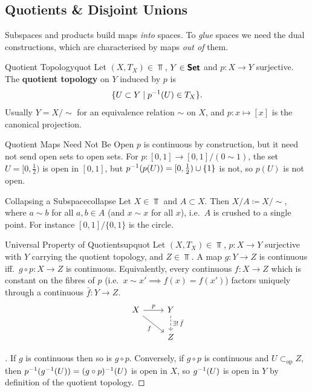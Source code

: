 \subsection{Quotients \& Disjoint Unions}

Subspaces and products build maps \emph{into} spaces. To \emph{glue} spaces we need the dual constructions, which are characterised by maps \emph{out of} them.

\begin{definition}{Quotient Topology}{quot}
    Let $(X,T_X)\in\Top$, $Y\in\bm{\mathsf{Set}}$ and $p:X\to Y$ surjective. The \textbf{quotient topology} on $Y$ induced by $p$ is \[
    \{U\subset Y\mid p^{-1}(U)\in T_X\}.
    \]
    Usually $Y=X/{\sim}$ for an equivalence relation $\sim$ on $X$, and $p:x\mapsto[x]$ is the canonical projection.
\end{definition}

\begin{remark}{Quotient Maps Need Not Be Open}{}
    $p$ is continuous by construction, but it need not send open sets to open sets. For $p:[0,1]\to[0,1]/(0\sim1)$, the set $U=[0,\tfrac12)$ is open in $[0,1]$, but $p^{-1}(p(U))=[0,\tfrac12)\cup\{1\}$ is not, so $p(U)$ is not open.
\end{remark}

\begin{example}{Collapsing a Subspace}{collapse}
    Let $X\in\Top$ and $A\subset X$. Then $X/A\coloneqq X/{\sim}$, where $a\sim b$ for all $a,b\in A$ (and $x\sim x$ for all $x$), i.e.\ $A$ is crushed to a single point. For instance $[0,1]/\{0,1\}$ is the circle.
\end{example}

\begin{theorem}{Universal Property of Quotients}{upquot}
    Let $(X,T_X)\in\Top$, $p:X\to Y$ surjective with $Y$ carrying the quotient topology, and $Z\in\Top$. A map $g:Y\to Z$ is continuous iff.\ $g\circ p:X\to Z$ is continuous. Equivalently, every continuous $f:X\to Z$ which is constant on the fibres of $p$ (i.e.\ $x\sim x'\implies f(x)=f(x')$) factors uniquely through a continuous $\bar f:Y\to Z$.
    \[\begin{tikzcd}
        X \arrow[r, "p"] \arrow[rd, "f"'] & Y \arrow[d, dashed, "\exists!\,\bar f"] \\
        & Z
    \end{tikzcd}\]
\end{theorem}
\begin{proof}[]
    If $g$ is continuous then so is $g\circ p$. Conversely, if $g\circ p$ is continuous and $U\subset_{\text{op}}Z$, then $p^{-1}(g^{-1}(U))=(g\circ p)^{-1}(U)$ is open in $X$, so $g^{-1}(U)$ is open in $Y$ by definition of the quotient topology.
\end{proof}

